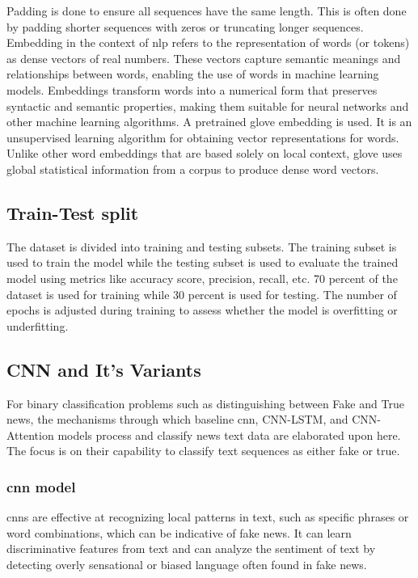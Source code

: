 Padding is done to ensure all sequences have the same length. This is often done by padding shorter sequences with zeros or truncating longer sequences. Embedding in the context of \ac{nlp} refers to the representation of words (or tokens) as dense vectors of real numbers. These vectors capture semantic meanings and relationships between words, enabling the use of words in machine learning models. Embeddings transform words into a numerical form that preserves syntactic and semantic properties, making them suitable for neural networks and other machine learning algorithms. A pretrained \ac{glove} embedding is used. It is an unsupervised learning algorithm for obtaining vector representations for words. Unlike other word embeddings that are based solely on local context, \ac{glove} uses global statistical information from a corpus to produce dense word vectors.

\subsection{Train-Test split}

The dataset is divided into training and testing subsets. The training subset is used to train the model while the testing subset is used to evaluate the trained model using metrics like accuracy score, precision, recall, etc. 70 percent of the dataset is used for training while 30 percent is used for testing. The number of epochs is adjusted during training to assess whether the model is overfitting or underfitting.

\subsection{CNN and It's Variants}
    
    For binary classification problems such as distinguishing between Fake and True news, the mechanisms through which baseline \ac{cnn}, CNN-LSTM, and CNN-Attention models process and classify news text data are elaborated upon here. The focus is on their capability to classify text sequences as either fake or true.

    \subsubsection{\ac{cnn} model}
    \ac{cnn}s are effective at recognizing local patterns in text, such as specific phrases or word combinations, which can be indicative of fake news. It can learn discriminative features from text and can analyze the sentiment of text by detecting overly sensational or biased language often found in fake news. \\
    
